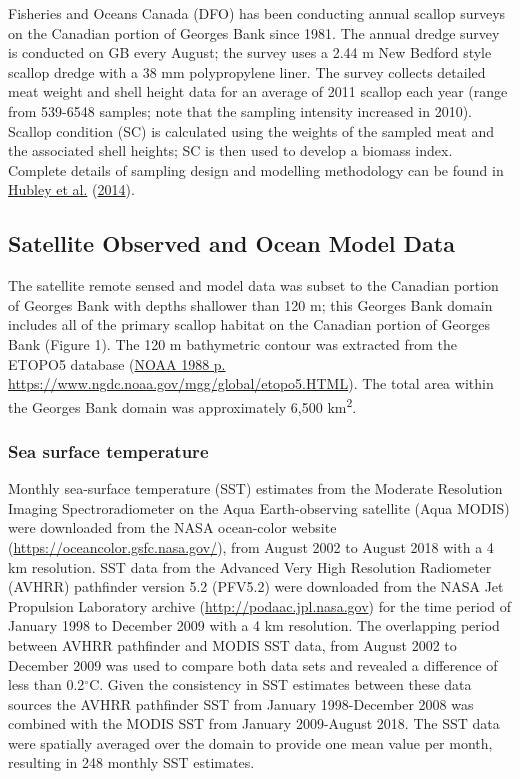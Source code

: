 \documentclass[
]{article}
\begin{document}
Fisheries and Oceans Canada (DFO) has been conducting annual scallop surveys on the Canadian portion of Georges Bank since 1981. The annual dredge survey is conducted on GB every August; the survey uses a 2.44 m New Bedford style scallop dredge with a 38 mm polypropylene liner. The survey collects detailed meat weight and shell height data for an average of 2011 scallop each year (range from 539-6548 samples; note that the sampling intensity increased in 2010). Scallop condition (SC) is calculated using the weights of the sampled meat and the associated shell heights; SC is then used to develop a biomass index. Complete details of sampling design and modelling methodology can be found in \protect\hyperlink{ref-hubleyGeorgesBankBrowns2014}{Hubley et al.} (\protect\hyperlink{ref-hubleyGeorgesBankBrowns2014}{2014}).

\hypertarget{satellite-observed-and-ocean-model-data}{%
\subsection{Satellite Observed and Ocean Model Data}\label{satellite-observed-and-ocean-model-data}}

The satellite remote sensed and model data was subset to the Canadian portion of Georges Bank with depths shallower than 120 m; this Georges Bank domain includes all of the primary scallop habitat on the Canadian portion of Georges Bank (Figure 1). The 120 m bathymetric contour was extracted from the ETOPO5 database (\protect\hyperlink{ref-noaaDataAnnouncement88MGG021988}{NOAA 1988 p. https://www.ngdc.noaa.gov/mgg/global/etopo5.HTML}). The total area within the Georges Bank domain was approximately 6,500 km\textsuperscript{2}.

\hypertarget{sea-surface-temperature}{%
\subsubsection{Sea surface temperature}\label{sea-surface-temperature}}

Monthly sea-surface temperature (SST) estimates from the Moderate Resolution Imaging Spectroradiometer on the Aqua Earth-observing satellite (Aqua MODIS) were downloaded from the NASA ocean-color website (\url{https://oceancolor.gsfc.nasa.gov/}), from August 2002 to August 2018 with a 4 km resolution. SST data from the Advanced Very High Resolution Radiometer (AVHRR) pathfinder version 5.2 (PFV5.2) were downloaded from the NASA Jet Propulsion Laboratory archive (\url{http://podaac.jpl.nasa.gov}) for the time period of January 1998 to December 2009 with a 4 km resolution. The overlapping period between AVHRR pathfinder and MODIS SST data, from August 2002 to December 2009 was used to compare both data sets and revealed a difference of less than 0.2\(^{\circ}\)C. Given the consistency in SST estimates between these data sources the AVHRR pathfinder SST from January 1998-December 2008 was combined with the MODIS SST from January 2009-August 2018. The SST data were spatially averaged over the domain to provide one mean value per month, resulting in 248 monthly SST estimates.
\end{document}
